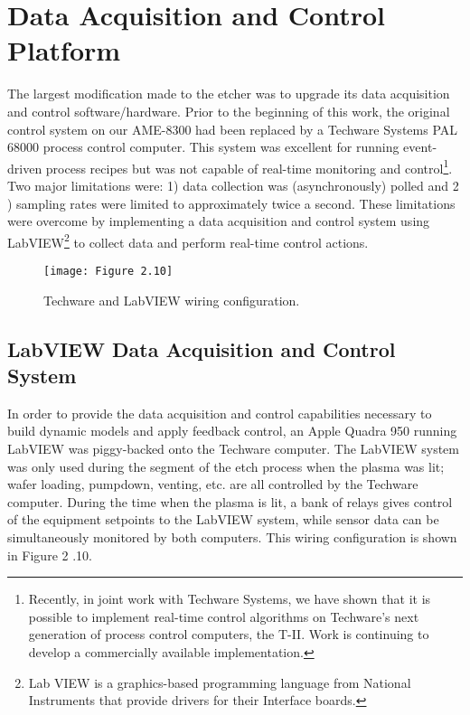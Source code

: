 
\section{Data Acquisition and Control Platform}

\tab The largest modification made to the etcher was to upgrade its data acquisition and control software/hardware. Prior to the beginning of this work, the original control system on our AME-8300 had been replaced by a Techware Systems PAL 68000 process control computer. This system was excellent for running event-driven process recipes but was not capable of real-time monitoring and control\footnote{Recently, in joint work with Techware Systems, we have shown that it is possible to implement real-time control algorithms on Techware’s next generation of process control computers, the T-II. Work is continuing to develop a commercially available implementation.}. Two major limitations were: 1) data collection was (asynchronously) polled and 2 ) sampling rates were limited to approximately twice a second. These limitations were overcome by implementing a data acquisition and control system using LabVIEW\footnote{Lab VIEW is a graphics-based programming language from National Instruments that provide drivers for their Interface boards.
} to collect data and perform real-time control actions.


\begin{figure}[H]
	\centering
	\texttt{[image: Figure 2.10]}
	\bf\caption{  Techware and LabVIEW wiring configuration.}
	\label{fig:2.10}
\end{figure}


\subsection{LabVIEW Data Acquisition and Control System}

\tab In order to provide the data acquisition and control capabilities necessary to build dynamic models and apply feedback control, an Apple Quadra 950 running LabVIEW was piggy-backed onto the Techware computer. The LabVIEW system was only used during the segment of the etch process when the plasma was lit; wafer loading, pumpdown, venting, etc. are all controlled by the Techware computer. During the time when the plasma is lit, a bank of relays gives control of the equipment setpoints to the LabVIEW system, while sensor data can be simultaneously monitored by both computers. This wiring configuration is shown in Figure 2 .10.


